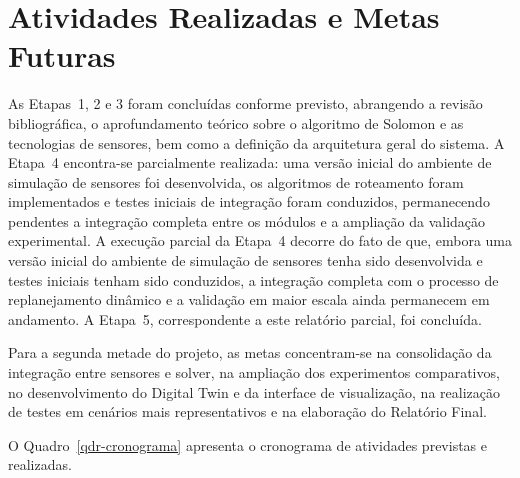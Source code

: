 \documentclass[12pt, a4paper]{article}
\begin{document}
\section{Atividades Realizadas e Metas Futuras}
\label{sec-atividades}

As Etapas~1, 2 e 3 foram concluídas conforme previsto, abrangendo a revisão bibliográfica, o aprofundamento teórico sobre o algoritmo de Solomon e as tecnologias de sensores, bem como a definição da arquitetura geral do sistema. A Etapa~4 encontra-se parcialmente realizada: uma versão inicial do ambiente de simulação de sensores foi desenvolvida, os algoritmos de roteamento foram implementados e testes iniciais de integração foram conduzidos, permanecendo pendentes a integração completa entre os módulos e a ampliação da validação experimental. A execução parcial da Etapa~4 decorre do fato de que, embora uma versão inicial do ambiente de simulação de sensores tenha sido desenvolvida e testes iniciais tenham sido conduzidos, a integração completa com o processo de replanejamento dinâmico e a validação em maior escala ainda permanecem em andamento. A Etapa~5, correspondente a este relatório parcial, foi concluída.

Para a segunda metade do projeto, as metas concentram-se na consolidação da integração entre sensores e solver, na ampliação dos experimentos comparativos, no desenvolvimento do Digital Twin e da interface de visualização, na realização de testes em cenários mais representativos e na elaboração do Relatório Final.

O Quadro~\ref{qdr-cronograma} apresenta o cronograma de atividades previstas e realizadas. 
\end{document}
